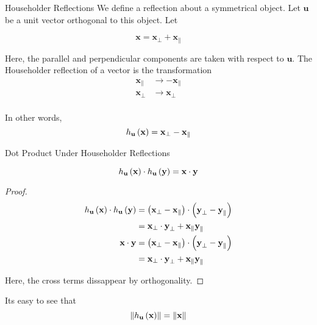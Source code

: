 \documentclass[11pt]{article}
\begin{document}
\begin{definition}{Householder Reflections}
  We define a reflection about a symmetrical object.
  Let $\bm{u}$ be a unit vector orthogonal to this object.
  Let
  
  $$
  \bm{x} = \bm{x}_{\perp} + \bm{x}_{\parallel}
  $$
  
  Here, the parallel and perpendicular components are taken with respect to $\bm{u}$.
  The Householder reflection of a vector is the transformation
  \begin{align*}
    \bm{x}_{\parallel} &\to - \bm{x}_{\parallel} \\
    \bm{x}_{\perp} &\to  \bm{x}_{\perp} \\
  \end{align*}

  In other words,
  $$
  h_{\textbf{u}} \left ( \textbf{x} \right) = \textbf{x}_{\perp} - \textbf{x}_{\parallel}
  $$
\end{definition}


\begin{lemma}{Dot Product Under Householder Reflections}
  
  $$
  h_{\textbf{u}} \left ( \textbf{x} \right) \cdot h_{\textbf{u}} \left ( \textbf{y} \right) = \textbf{x} \cdot \textbf{y}
  $$

  \begin{proof}
    
    \begin{align*}
      h_{\textbf{u}} \left ( \textbf{x} \right) \cdot h_{\textbf{u}} \left ( \textbf{y} \right) &= \left ( \textbf{x}_{\perp} - \textbf{x}_{\parallel} \right) \cdot \left ( \textbf{y}_{\perp} - \textbf{y}_{\parallel} \right) \\
                                                              &= \textbf{x}_{\perp} \cdot \textbf{y}_{\perp} + \textbf{x}_{\parallel} \textbf{y}_{\parallel} \\
      \textbf{x} \cdot \textbf{y} &= \left ( \textbf{x}_{\perp} - \textbf{x}_{\parallel} \right) \cdot \left ( \textbf{y}_{\perp} - \textbf{y}_{\parallel} \right) \\
                                                              &= \textbf{x}_{\perp} \cdot \textbf{y}_{\perp} + \textbf{x}_{\parallel} \textbf{y}_{\parallel} \\
    \end{align*}

    Here, the cross terms dissappear by orthogonality.
  \end{proof}
\end{lemma}

Its easy to see that $$ \left\lVert h_{\textbf{u}} \left ( \textbf{x} \right)\right\rVert = \left\lVert\textbf{x}\right\rVert$$
\end{document}
